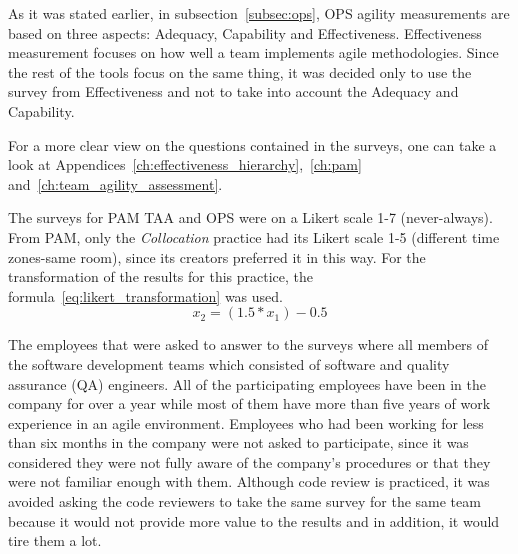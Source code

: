 
As it was stated earlier, in subsection~\ref{subsec:ops}, \ac{OPS} agility measurements are based on three aspects: Adequacy, Capability and Effectiveness. Effectiveness measurement focuses on how well a team implements agile methodologies. Since the rest of the tools focus on the same thing, it was decided only to use the survey from Effectiveness and not to take into account the Adequacy and Capability.

For a more clear view on the questions contained in the surveys, one can take a look at Appendices~\ref{ch:effectiveness_hierarchy},~\ref{ch:pam} and~\ref{ch:team_agility_assessment}.

The surveys for \ac{PAM} \ac{TAA} and \ac{OPS} were on a Likert scale 1-7 (never-always). From \ac{PAM}, only the \textit{Collocation} practice had its Likert scale 1-5 (different time zones-same room), since its creators preferred it in this way. For the transformation of the results for this practice, the formula~\eqref{eq:likert_transformation} \cite{likert_transformation} was used.  \begin{equation} \label{eq:likert_transformation} x_2 = (1.5 * x_1) - 0.5 \end{equation} 

The employees that were asked to answer to the surveys where all members of the software development teams which consisted of software and quality assurance (QA) engineers. All of the participating employees have been in the company for over a year while most of them have more than five years of work experience in an agile environment. Employees who had been working for less than six months in the company were not asked to participate, since it was considered they were not fully aware of the company's procedures or that they were not familiar enough with them. Although code review is practiced, it was avoided asking the code reviewers to take the same survey for the same team because it would not provide more value to the results and in addition, it would tire them a lot.

